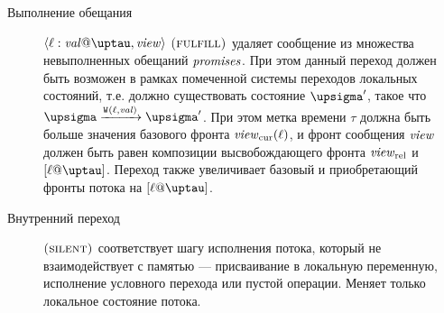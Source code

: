\begin{description}
  \item[Выполнение обещания] $\writeEvt{\loc}{\stval}{\tau}{\R}$ $\textsc{(fulfill)}$ удаляет сообщение из множества
    невыполненных обещаний $\mathit{promises}$. При этом данный переход должен быть возможен в
    рамках помеченной системы переходов локальных состояний, т.е. должно существовать
    состояние $\pstate'$, такое что $\pstate \xrightarrow{\wlab{}{\loc}{\stval}} \pstate'$.
    При этом метка времени $\tau$ должна быть больше значения базового фронта $\mathit{view}_{\mathrm{cur}}(\ell)$,
    и фронт сообщения $\mathit{view}$ должен быть равен композиции высвобождающего фронта $\mathit{view}_{\mathrm{rel}}$
    и $[\loc@\tau]$. Переход также увеличивает базовый и приобретающий фронты потока на $[\loc@\tau]$.

  \item[Внутренний переход] $\textsc{(silent)}$ соответствует шагу исполнения потока, который не взаимодействует
    с памятью --- присваивание в локальную переменную, исполнение условного перехода или пустой операции.
    Меняет только локальное состояние потока.
\end{description}




